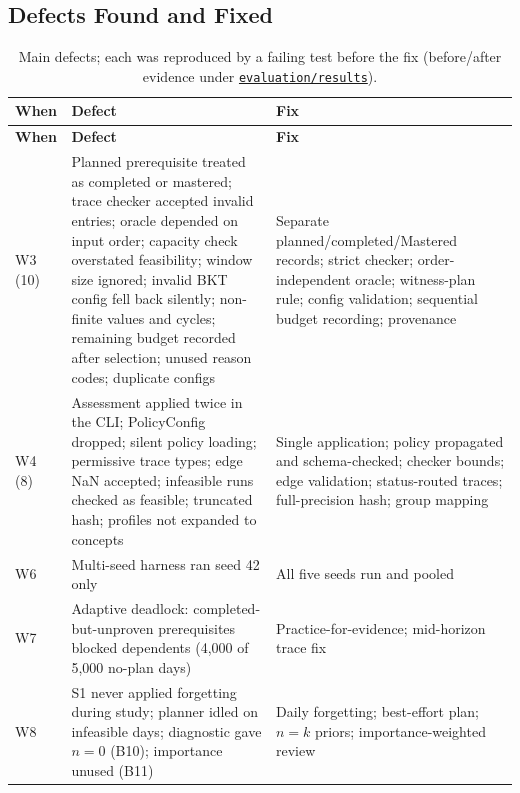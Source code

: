 \documentclass[english]{sintr}
\newcommand{\repourl}{https://github.com/Bhuvan-56/adaptive-learning-path-planner-DAT}
\newcommand{\sha}{cs5903-final-2026}
\DeclareRobustCommand{\rd}[1]{\href{\repourl/tree/\sha/#1}{\nolinkurl{#1}}}
\begin{document}
\subsection{Defects Found and Fixed}
{\small
\begin{longtable}{|L{1.52cm}|L{7.61cm}|L{5.90cm}|}
\caption{Main defects; each was reproduced by a failing test before the fix (before/after evidence under \rd{evaluation/results}).}\\
\hline
\textbf{When} & \textbf{Defect} & \textbf{Fix} \\ \hline
\endfirsthead
\hline \textbf{When} & \textbf{Defect} & \textbf{Fix} \\ \hline
\endhead
W3 (10) & Planned prerequisite treated as completed or mastered; trace checker accepted invalid entries; oracle depended on input order; capacity check overstated feasibility; window size ignored; invalid BKT config fell back silently; non-finite values and cycles; remaining budget recorded after selection; unused reason codes; duplicate configs & Separate planned/completed/Mastered records; strict checker; order-independent oracle; witness-plan rule; config validation; sequential budget recording; provenance \\ \hline
W4 (8) & Assessment applied twice in the CLI; PolicyConfig dropped; silent policy loading; permissive trace types; edge NaN accepted; infeasible runs checked as feasible; truncated hash; profiles not expanded to concepts & Single application; policy propagated and schema-checked; checker bounds; edge validation; status-routed traces; full-precision hash; group mapping \\ \hline
W6 & Multi-seed harness ran seed 42 only & All five seeds run and pooled \\ \hline
W7 & Adaptive deadlock: completed-but-unproven prerequisites blocked dependents (4,000 of 5,000 no-plan days) & Practice-for-evidence; mid-horizon trace fix \\ \hline
W8 & S1 never applied forgetting during study; planner idled on infeasible days; diagnostic gave $n=0$ (B10); importance unused (B11) & Daily forgetting; best-effort plan; $n=k$ priors; importance-weighted review \\ \hline
\end{longtable}
}
\end{document}
